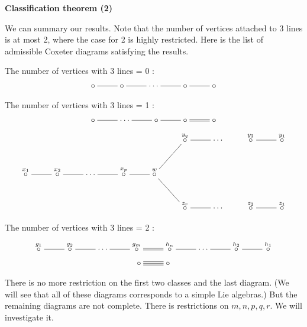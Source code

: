\documentclass{article}
\begin{document}
\newpage

\textbf{Classification theorem (2)}

We can summary our results.
Note that the number of vertices attached to 3 lines is at most 2, where the case for 2 is highly restricted.
Here is the list of admissible Coxeter diagrams satisfying the results.

The number of vertices with 3 lines = 0 : 
\begin{displaymath}
  \xymatrix{\circ \ar@{-}[r] & \circ \ar@{-}[r] & \cdots \ar@{-}[r] & \circ \ar@{-}[r] & \circ}
\end{displaymath}

The number of vertices with 3 lines = 1 : 
\begin{displaymath}
  \xymatrix{\circ \ar@{-}[r] & \cdots \ar@{-}[r] & \circ \ar@{-}[r] & \circ \ar@2{-}[r] & \circ}
\end{displaymath}
\begin{displaymath}
  \xymatrix{
    & & & & & \overset{y_q}{\circ} \ar@{-}[r] & \cdots & \overset{y_2}{\circ} \ar@{-}[r] & \overset{y_1}{\circ} \\
    \overset{x_1}{\circ} \ar@{-}[r] & \overset{x_2}{\circ} \ar@{-}[r] & \cdots \ar@{-}[r] & \overset{x_p}{\circ} \ar@{-}[r] & \overset{w}{\circ} \ar@{-}[ru] \ar@{-}[rd] \\
   & & & & & \overset{z_r}{\circ} \ar@{-}[r] & \cdots & \overset{z_2}{\circ} \ar@{-}[r] & \overset{z_1}{\circ}}
\end{displaymath}

The number of vertices with 3 lines = 2 : 
\begin{displaymath}
  \xymatrix{\overset{g_1}{\circ} \ar@{-}[r] & \overset{g_2}{\circ} \ar@{-}[r] & \cdots \ar@{-}[r] & \overset{g_m}{\circ} \ar@2{-}[r] & \overset{h_n}{\circ} \ar@{-}[r] & \cdots \ar@{-}[r] & \overset{h_2}{\circ} \ar@{-}[r] & \overset{h_1}{\circ} }
\end{displaymath}
\begin{displaymath}
  \xymatrix{\circ \ar@3{-}[r] & \circ}
\end{displaymath}

There is no more restriction on the first two classes and the last diagram.
(We will see that all of these diagrams corresponds to a simple Lie algebras.)
But the remaining diagrams are not complete.
There is restrictions on $m, n, p, q, r$.
We will investigate it.
\end{document}
